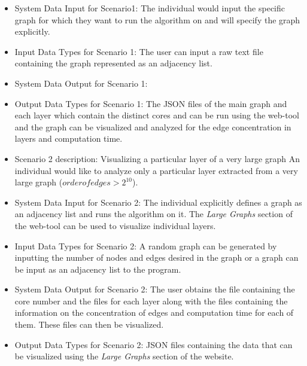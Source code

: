 \begin{itemize}
\begin{itemize}
	\item{System Data Input for Scenario1: }
	The individual would input the specific graph for which they want to run the algorithm on and will specify the graph explicitly.
    \item{Input Data Types for Scenario 1:}
    The user can input a raw text file containing the graph represented as an adjacency list.
	\item{System Data Output for Scenario 1: }
	
    \item {Output Data Types for Scenario 1:}
    The JSON files of the main graph and each layer which contain the distinct cores and can be run using the web-tool and the graph can be visualized and analyzed for the edge concentration in layers and computation time.
    \item{Scenario 2 description: Visualizing a particular layer of a very large graph}
	An individual would like to analyze only a particular layer extracted from a very large graph ($order of edges > 2^{10}$).
	\item{System Data Input for Scenario 2: }
	The individual explicitly defines a graph as an adjacency list and runs the algorithm on it. The \textit{Large Graphs} section of the web-tool can be used to visualize individual layers.
    \item{Input Data Types for Scenario 2:}
    A random graph can be generated by inputting the number of nodes and edges desired in the graph or a graph can be input as an adjacency list to the program.
	\item{System Data Output for Scenario 2: }
	The user obtains the file containing the core number and the files for each layer along with the files containing the information on the concentration of edges and computation time for each of them. These files can then be visualized.
    \item {Output Data Types for Scenario 2:}
    JSON files containing the data that can be visualized using the \textit{Large Graphs} section of the website. 
	\end{itemize}
\end{itemize}